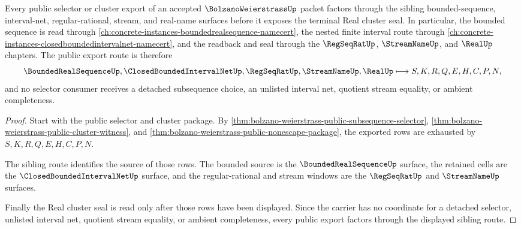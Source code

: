 \begin{theorem}
\label{thm:bolzano-weierstrass-public-selector-export}
Every public selector or cluster export of an accepted $\BolzanoWeierstrassUp$ packet factors through the sibling bounded-sequence, interval-net, regular-rational, stream, and real-name surfaces before it exposes the terminal Real cluster seal. In particular, the bounded sequence is read through \autoref{ch:concrete-instances-boundedrealsequence-namecert}, the nested finite interval route through \autoref{ch:concrete-instances-closedboundedintervalnet-namecert}, and the readback and seal through the $\RegSeqRatUp$, $\StreamNameUp$, and $\RealUp$ chapters. The public export route is therefore
$$
\BoundedRealSequenceUp,\ClosedBoundedIntervalNetUp,\RegSeqRatUp,\StreamNameUp,\RealUp
\longmapsto
S,K,R,Q,E,H,C,P,N ,
$$
and no selector consumer receives a detached subsequence choice, an unlisted interval net, quotient stream equality, or ambient completeness.
\end{theorem}
\begin{proof}
Start with the public selector and cluster package. By \autoref{thm:bolzano-weierstrass-public-subsequence-selector}, \autoref{thm:bolzano-weierstrass-public-cluster-witness}, and \autoref{thm:bolzano-weierstrass-public-nonescape-package}, the exported rows are exhausted by $S,K,R,Q,E,H,C,P,N$.

The sibling route identifies the source of those rows. The bounded source is the $\BoundedRealSequenceUp$ surface, the retained cells are the $\ClosedBoundedIntervalNetUp$ surface, and the regular-rational and stream windows are the $\RegSeqRatUp$ and $\StreamNameUp$ surfaces.

Finally the Real cluster seal is read only after those rows have been displayed. Since the carrier has no coordinate for a detached selector, unlisted interval net, quotient stream equality, or ambient completeness, every public export factors through the displayed sibling route.
\end{proof}
